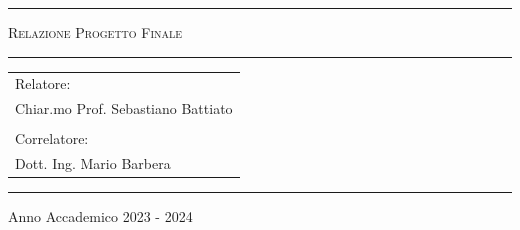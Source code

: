 \begin{titlepage}
\begin{minipage}[b]{8 cm} %
\hrule

\bigskip

{\centering\scshape 
Relazione Progetto Finale
\par}

\bigskip

\hrule
\end{minipage} %

\bigskip

\bigskip

\bigskip

\bigskip

\bigskip

\bigskip

\bigskip

\bigskip

\bigskip

\bigskip

\bigskip %

\vspace*{\fill}

\begin{flushright}
    \begin{tabular}{@{}l}
    Relatore: \\
    Chiar.mo Prof. Sebastiano Battiato \\
    \\
    Correlatore: \\
    Dott. Ing. Mario Barbera
    \end{tabular}
\end{flushright}

\bigskip

\bigskip

\bigskip

\bigskip %

\hrule

\bigskip

{\centering
Anno Accademico 2023 - 2024
\par}
\end{titlepage}
